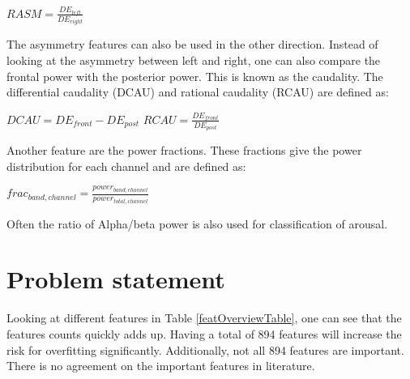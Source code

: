 \documentclass[12pt,journal,compsoc]{IEEEtran}
\newcommand{\npar}{\par \vspace{2.3ex plus 0.3ex minus 0.3ex}}
\begin{document}
\begin{center}
$RASM = \frac{DE_{left}}{DE_{right}}$
\end{center}

The asymmetry features can also be used in the other direction\cite{GivenPaper}. Instead of looking at the asymmetry between left and right, one can also compare the frontal power with the posterior power. This is known as the caudality. The differential caudality (DCAU) and rational caudality (RCAU) are defined as:
\begin{center}
$DCAU = DE_{front} - DE_{post}$
$RCAU = \frac{DE_{front}}{DE_{post}}$
\end{center}

\npar

Another feature are the power fractions. These fractions give the power distribution for each channel\citep{ExtendedPaper} and are defined as:
\begin{center}
$frac_{band,channel} = \frac{power_{band,channel}}{power_{total,channel}}$
\end{center}
Often the ratio of Alpha/beta power is also used for classification of arousal\citep{ref4}.

\section{Problem statement}\label{problem}
Looking at different features in Table \ref{featOverviewTable}, one can see that the features counts quickly adds up. Having a total of 894 features will increase the risk for overfitting significantly\citep{rfPaper}. Additionally, not all 894 features are important. There is no agreement on the important features in literature. 
\end{document}

